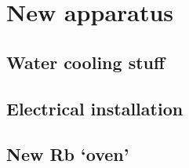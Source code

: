 \appendix
\renewcommand{\thechapter}{B}
\renewcommand{\chaptername}{Appendix}

\chapter{New apparatus}
\label{app:new_apparatus}



\section{Water cooling stuff}
\section{Electrical installation}
\section{New Rb `oven'}

